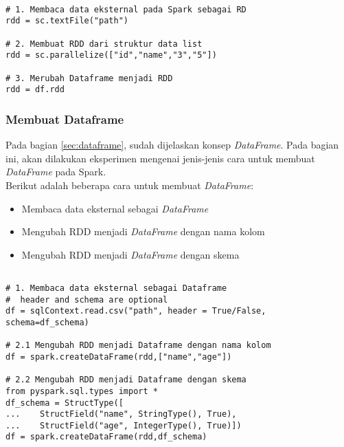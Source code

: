 \begin{lstlisting}[basicstyle=\ttfamily, frame=single,
	columns=fullflexible, keepspaces=true, breaklines=true, label=ls_kepatuhan_1_1_1_logo_sharif_judge, caption=Cara Pembuatan RDD]
	
# 1. Membaca data eksternal pada Spark sebagai RD
rdd = sc.textFile("path")

# 2. Membuat RDD dari struktur data list
rdd = sc.parallelize(["id","name","3","5"])

# 3. Merubah Dataframe menjadi RDD
rdd = df.rdd

\end{lstlisting}

\subsubsection{Membuat Dataframe}
Pada bagian \ref{sec:dataframe}, sudah dijelaskan konsep \textit{DataFrame}. Pada bagian ini, akan dilakukan eksperimen mengenai jenis-jenis cara untuk membuat \textit{DataFrame} pada Spark.\\

\noindent Berikut adalah beberapa cara untuk membuat \textit{DataFrame}:
\begin{itemize}
\item Membaca data eksternal sebagai \textit{DataFrame}
\item Mengubah RDD menjadi \textit{DataFrame} dengan nama kolom
\item Mengubah RDD menjadi \textit{DataFrame} dengan skema
\end{itemize}
\begin{lstlisting}[basicstyle=\ttfamily, frame=single,
	columns=fullflexible, keepspaces=true, breaklines=true, label=ls_kepatuhan_1_1_1_logo_sharif_judge, caption=Cara Pembuatan Dataframe]
	
# 1. Membaca data eksternal sebagai Dataframe
#  header and schema are optional
df = sqlContext.read.csv("path", header = True/False, schema=df_schema)

# 2.1 Mengubah RDD menjadi Dataframe dengan nama kolom
df = spark.createDataFrame(rdd,["name","age"])

# 2.2 Mengubah RDD menjadi Dataframe dengan skema
from pyspark.sql.types import *
df_schema = StructType([
...    StructField("name", StringType(), True),
...    StructField("age", IntegerType(), True)])
df = spark.createDataFrame(rdd,df_schema)

\end{lstlisting}

